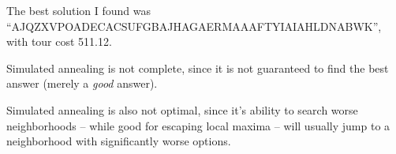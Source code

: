 \documentclass[12pt]{article}
\begin{document}
\problemasub
{}
The best solution I found was ``AJQZXVPOADECACSUFGBAJHAGAERMAAAFTYIAIAHLDNABWK'', with tour cost 511.12.

\problemasub
Simulated annealing is not complete, since it is not guaranteed to find the best answer (merely a \textit{good} answer).

\problemasub
Simulated annealing is also not optimal, since it's ability to search worse neighborhoods -- while good for escaping
local maxima -- will usually jump to a neighborhood with significantly worse options.
\end{document}
